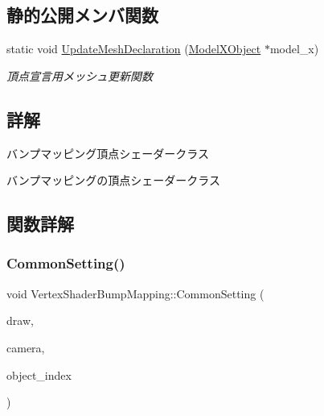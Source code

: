 \subsection*{静的公開メンバ関数}
\begin{DoxyCompactItemize}
\item 
static void \mbox{\hyperlink{class_vertex_shader_bump_mapping_a659d50e57533b9cd0204fc169985f1e0}{Update\+Mesh\+Declaration}} (\mbox{\hyperlink{class_model_x_object}{Model\+X\+Object}} $\ast$model\+\_\+x)
\begin{DoxyCompactList}\small\item\em 頂点宣言用メッシュ更新関数 \end{DoxyCompactList}\end{DoxyCompactItemize}


\subsection{詳解}
バンプマッピング頂点シェーダークラス 

バンプマッピングの頂点シェーダークラス 

\subsection{関数詳解}
\mbox{\label{class_vertex_shader_bump_mapping_a7979584d035fff86d386c99617a8dd2c}} 
\subsubsection{\texorpdfstring{Common\+Setting()}{CommonSetting()}}
{\footnotesize\ttfamily void Vertex\+Shader\+Bump\+Mapping\+::\+Common\+Setting (\begin{DoxyParamCaption}\item[{\mbox{\hyperlink{class_draw_base}{Draw\+Base}} $\ast$}]{draw,  }\item[{\mbox{\hyperlink{class_camera}{Camera}} $\ast$}]{camera,  }\item[{unsigned}]{object\+\_\+index }\end{DoxyParamCaption})\hspace{0.3cm}{\ttfamily [virtual]}}



